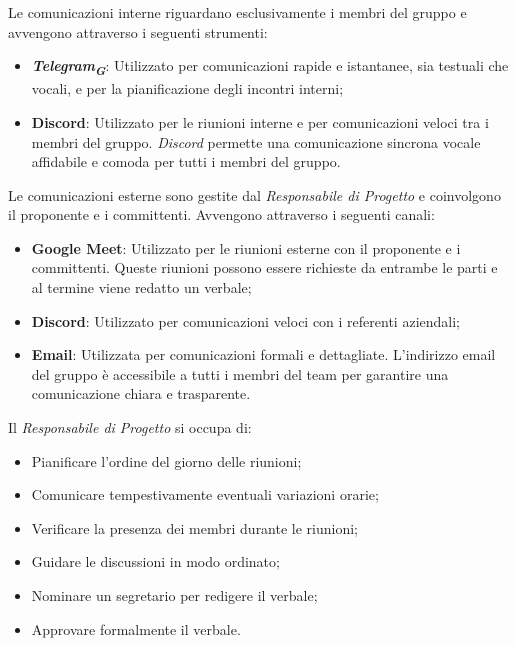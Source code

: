 Le comunicazioni interne riguardano esclusivamente i membri del gruppo e avvengono attraverso i seguenti strumenti:
\begin{itemize}
    \item \textbf{\emph{Telegram}}\textsubscript{\textit{\textbf{G}}}: Utilizzato per comunicazioni rapide e istantanee, sia testuali che vocali, e per la pianificazione degli incontri interni;
    \item \textbf{Discord}: Utilizzato per le riunioni interne e per comunicazioni veloci tra i membri del gruppo. \emph{Discord} permette una comunicazione sincrona vocale affidabile e comoda per tutti i membri del gruppo.
\end{itemize}

Le comunicazioni esterne sono gestite dal \emph{Responsabile di Progetto} e coinvolgono il proponente e i committenti. Avvengono attraverso i seguenti canali:
\begin{itemize}
    \item \textbf{Google Meet}: Utilizzato per le riunioni esterne con il proponente e i committenti. Queste riunioni possono essere richieste da entrambe le parti e al termine viene redatto un verbale;
    \item \textbf{Discord}: Utilizzato per comunicazioni veloci con i referenti aziendali;
    \item \textbf{Email}: Utilizzata per comunicazioni formali e dettagliate. L'indirizzo email del gruppo è accessibile a tutti i membri del team per garantire una comunicazione chiara e trasparente.
\end{itemize}

Il \emph{Responsabile di Progetto} si occupa di:
\begin{itemize}
    \item Pianificare l'ordine del giorno delle riunioni;
    \item Comunicare tempestivamente eventuali variazioni orarie;
    \item Verificare la presenza dei membri durante le riunioni;
    \item Guidare le discussioni in modo ordinato;
    \item Nominare un segretario per redigere il verbale;
    \item Approvare formalmente il verbale.
\end{itemize}

